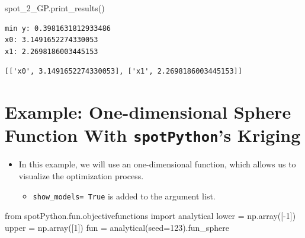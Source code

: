 \documentclass[
  letterpaper,
  DIV=11,
  numbers=noendperiod]{scrreprt}
\newenvironment{Shaded}{\begin{snugshade}}{\end{snugshade}}
\newcommand{\DecValTok}[1]{\textcolor[rgb]{0.68,0.00,0.00}{#1}}
\newcommand{\ImportTok}[1]{\textcolor[rgb]{0.00,0.46,0.62}{#1}}
\newcommand{\NormalTok}[1]{\textcolor[rgb]{0.00,0.23,0.31}{#1}}
\newcommand{\OperatorTok}[1]{\textcolor[rgb]{0.37,0.37,0.37}{#1}}
\providecommand{\tightlist}{%
  \setlength{\itemsep}{0pt}\setlength{\parskip}{0pt}}\usepackage{longtable,booktabs,array}
\begin{document}
\begin{Shaded}
\begin{Highlighting}[]
\NormalTok{spot\_2\_GP.print\_results()}
\end{Highlighting}
\end{Shaded}

\begin{verbatim}
min y: 0.3981631812933486
x0: 3.1491652274330053
x1: 2.2698186003445153
\end{verbatim}

\begin{verbatim}
[['x0', 3.1491652274330053], ['x1', 2.2698186003445153]]
\end{verbatim}

\hypertarget{example-one-dimensional-sphere-function-with-spotpythons-kriging}{%
\section{\texorpdfstring{Example: One-dimensional Sphere Function With
\texttt{spotPython}'s
Kriging}{Example: One-dimensional Sphere Function With spotPython's Kriging}}\label{example-one-dimensional-sphere-function-with-spotpythons-kriging}}

\begin{itemize}
\tightlist
\item
  In this example, we will use an one-dimensional function, which allows
  us to visualize the optimization process.

  \begin{itemize}
  \tightlist
  \item
    \texttt{show\_models=\ True} is added to the argument list.
  \end{itemize}
\end{itemize}

\begin{Shaded}
\begin{Highlighting}[]
\ImportTok{from}\NormalTok{ spotPython.fun.objectivefunctions }\ImportTok{import}\NormalTok{ analytical}
\NormalTok{lower }\OperatorTok{=}\NormalTok{ np.array([}\OperatorTok{{-}}\DecValTok{1}\NormalTok{])}
\NormalTok{upper }\OperatorTok{=}\NormalTok{ np.array([}\DecValTok{1}\NormalTok{])}
\NormalTok{fun }\OperatorTok{=}\NormalTok{ analytical(seed}\OperatorTok{=}\DecValTok{123}\NormalTok{).fun\_sphere}
\end{Highlighting}
\end{Shaded}
\end{document}
